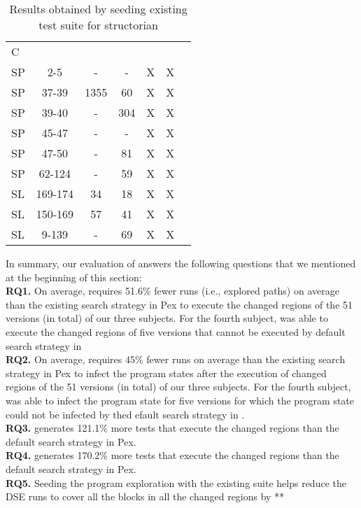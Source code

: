 \begin{table}
\begin{CodeOut}
\begin{center}
\caption {\label{table:rq5}Results obtained by seeding existing test suite for structorian}
\begin {tabular} {|l|c|c|c|c|c|c|}
\hline
&&&&&\\ 
\hline
C & \CenterCell{V} &\CenterCell{$N_{Pex}$}&\CenterCell{$Np_{seed}$} &\CenterCell{$N_{eXpress}$} &\CenterCell{$Ne_{seed}$}\\

\hline
SP&2-5&-&-&X&X\\
\hline
SP&37-39&1355&60&X&X\\
\hline
SP&39-40&-&304&X&X\\
\hline
SP&45-47&-&-&X&X\\
\hline
SP&47-50&-&81&X&X\\
\hline
SP&62-124&-&59&X&X\\
\hline
SL&169-174&34&18&X&X\\
\hline
SL&150-169&57&41&X&X\\
\hline
SL&9-139&-&69&X&X\\
\hline
\end{tabular}
\end{center}
\end{CodeOut}
\end{table}

In summary, our evaluation of  answers the following questions that we mentioned at the beginning of this section:
\\ \textbf{RQ1. }On average,  requires 51.6\% fewer runs (i.e., explored paths)
on average than the existing search strategy in Pex to execute the changed regions of the 51 versions (in total) of our three subjects. For the fourth subject,  was able to  execute the changed regions of five versions that cannot be executed by default search strategy in  
\\ \textbf{RQ2. }On average,  requires 45\% fewer
runs on average than the existing search strategy in Pex to infect the program states after the execution of changed regions of the 51 versions (in total) of our three subjects. For the fourth subject,  was able to  infect the program state for five versions for which the program state could not be infected by thed efault search strategy in  .
\\ \textbf{RQ3. }  generates 121.1\% more tests that execute the changed regions than the default search strategy in Pex.
\\ \textbf{RQ4. } generates 170.2\% more tests that execute the changed regions than the default search strategy in Pex.
\\ \textbf{RQ5. }Seeding the program exploration with the existing suite helps reduce the DSE runs to cover all the blocks in all the changed regions by **

